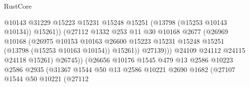\begin{lexlean}{RustCore}
\begin{coremodule}
                                            @10143
                                            @31229
                                            @15223
                                            @15231
                                            @15248
                                            @15251
                                            (@13798 (@15253 @10143 @10134))
                                            @15261))
                                        (@27112
                                          @1332
                                          @253
                                          @11
                                          @30
                                          @10168
                                          @2677
                                          (@26969
                                            @10168
                                            (@26975
                                              @10153
                                              @10163
                                              @26600
                                              @15223
                                              @15231
                                              @15248
                                              @15251
                                              (@13798 (@15253 @10163 @10154))
                                              @15261))
                                          @27139)))
                                    @24109
                                    @24112
                                    @24115
                                    @24118
                                    @15261)
                                  @26745))
                              (@26656
                                @10176
                                @1545
                                @479
                                @13
                                @2586
                                @10223
                                @2586
                                @2935
                                (@31367
                                  @1544
                                  @50
                                  @13
                                  @2586
                                  @10221
                                  @2690
                                  @1682
                                  (@27107
                                    @1544
                                    @50
                                    @10221
                                    (@27112

\end{coremodule}
\end{lexlean}
